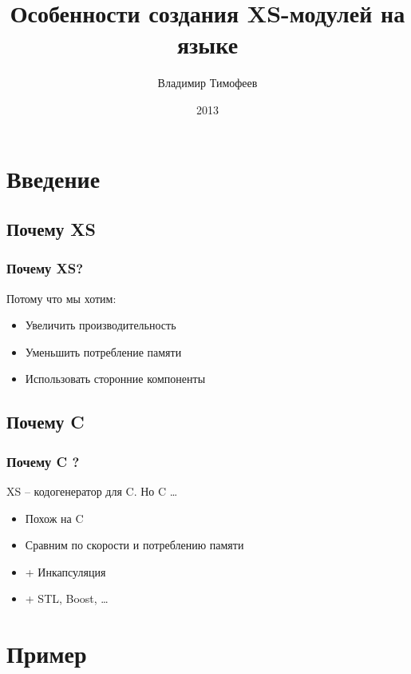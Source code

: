 \documentclass[pdflatex,hyperref={unicode=true}]{beamer}
\title{Особенности создания XS-модулей на языке \cpp}
\author{Владимир Тимофеев}
\date{2013}
\DeclareRobustCommand{\cpp}{
    \texorpdfstring{\hbox{C\hspace{-0.5ex}\protect\raisebox{0.5ex}{\protect\scalebox{0.67}{++}}}}{C++}
}
\begin{document}
\frame{\titlepage}

\frame{\tableofcontents[hideallsubsections]}

\section{Введение}


\subsection{Почему XS}

\begin{frame}
    \frametitle{Почему XS?}
    Потому что мы хотим:
    \begin{itemize}[<+->]
        \item Увеличить производительность
        \item Уменьшить потребление памяти
        \item Использовать сторонние компоненты
    \end{itemize}
\end{frame}

\subsection{Почему \cpp}

\begin{frame}
    \frametitle{Почему \cpp?}
    XS -- кодогенератор для C. Но \cpp\ldots
    \begin{itemize}[<+->]
        \item Похож на C
        \item Сравним по скорости и потреблению памяти
        \item + Инкапсуляция
        \item + STL, Boost, \dots
    \end{itemize}
\end{frame}

\section{Пример}
\end{document}
